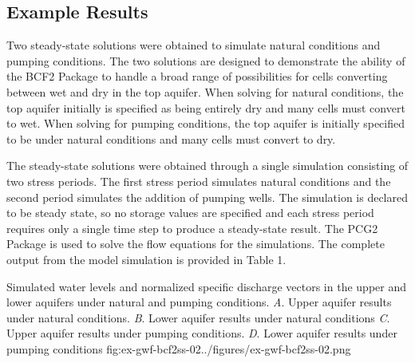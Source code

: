 \subsection{Example Results}

Two steady-state solutions were obtained to simulate natural conditions and pumping conditions. The two solutions are designed to demonstrate the ability of the BCF2 Package to handle a broad range of possibilities for cells converting between wet and dry in the top aquifer. When solving for natural conditions, the top aquifer initially is specified as being entirely dry and many cells must convert to wet. When solving for pumping conditions, the top aquifer is initially specified to be under natural conditions and many cells must convert to dry.

The steady-state solutions were obtained through a single simulation consisting of two stress periods. The first stress period simulates natural conditions and the second period simulates the addition of pumping wells. The simulation is declared to be steady state, so no storage values are specified and each stress period requires only a single time step to produce a steady-state result. The PCG2 Package is used to solve the flow equations for the simulations. The complete output from the model simulation is provided in Table 1.

\begin{StandardFigure}{
                                     Simulated water levels and normalized specific discharge vectors in 
                                     the upper and lower aquifers under natural and pumping conditions. 
                                     \textit{A}. Upper aquifer results under natural conditions.
                                     \textit{B}. Lower aquifer results under natural conditions
                                     \textit{C}. Upper aquifer results under pumping conditions.
                                     \textit{D}. Lower aquifer results under pumping conditions
                                     }{fig:ex-gwf-bcf2ss-02}{../figures/ex-gwf-bcf2ss-02.png}
\end{StandardFigure}                                 

